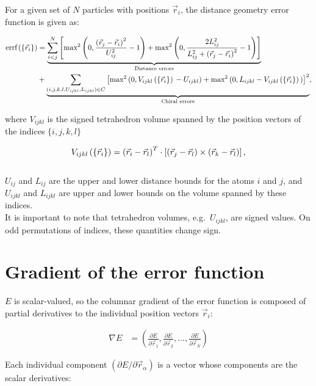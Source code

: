 \documentclass[a4paper]{article}
\begin{document}
For a given set of $N$ particles with positions $\vec{r}_i$, the distance
geometry error function is given as:

\begin{align}\begin{aligned} %
  \errf &= \underbrace {
    \ijNSum \left[
      \distanceErrorFirstTerm{2} + \distanceErrorSecondTerm{2}
    \right]
  }_{\textrm{Distance errors}}\\
  &+ \underbrace{
    \chiralSum \left[ 
      \chiralErrorFirstTerm{2} + \chiralErrorSecondTerm{2}
    \right]^{2}
  }_{\textrm{Chiral errors}},
\end{aligned}\end{align}

where $V_{ijkl}$ is the signed tetrahedron volume spanned by the position vectors of
the indices $\{i, j, k, l\}$

\begin{equation}
  V_{ijkl}\left( \left\{\vec{r}_i \right\} \right) =
    \left( \vec{r}_{i} - \vec{r}_{l} \right)^{T} \cdot \left[ \left( \vec{r}_{j} - \vec{r}_{l} \right) \times \left( \vec{r}_{k} - \vec{r}_{l} \right) \right],
\end{equation} \\

$U_{ij}$ and $L_{ij}$ are the upper and lower distance bounds for the atoms
$i$ and $j$, and $U_{ijkl}$ and $L_{ijkl}$ are upper and lower bounds on the
volume spanned by these indices.\\

It is important to note that tetrahedron volumes, e.g.\ $U_{ijkl}$, are
signed values. On odd permutations of indices, these quantities change sign.

\section{Gradient of the error function}

$E$ is scalar-valued, so the columnar gradient of the error function is
composed of partial derivatives to the individual position vectors $\vec{r}_i$:

\begin{align*}
  \nabla E &= \left(
    \frac{\partial E}{\partial \vec{r}_1},
    \frac{\partial E}{\partial \vec{r}_2},
    \ldots,
    \frac{\partial E}{\partial \vec{r}_N}
  \right)
\end{align*}

Each individual component $\left( \partial E / \partial \vec{r}_\alpha \right)$
is a vector whose components are the scalar derivatives:
\end{document}
